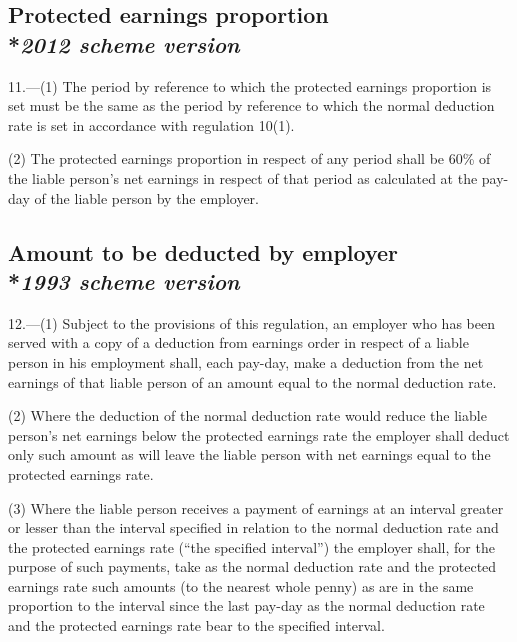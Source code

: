 \documentclass[12pt,a4paper]{article}
\begin{document}
\subsection[11. Protected earnings proportion --- \emph{2012 scheme version}]{Protected earnings proportion\\*\emph{2012 scheme version}}

11.---(1)  The period by reference to which the protected earnings proportion is set must be the same as the period by reference to which the normal deduction rate is set in accordance with regulation 10(1).

(2) The protected earnings proportion in respect of any period shall be 60\% of the liable person’s net earnings in respect of that period as calculated at the pay-day of the liable person by the employer.


\subsection[12. Amount to be deducted by employer --- \emph{1993 scheme version}]{Amount to be deducted by employer\\*\emph{1993 scheme version}}

12.—(1) Subject to the provisions of this regulation, an employer who has been served with a copy of a deduction from earnings order in respect of a liable person in his employment shall, each pay-day, make a deduction from the net earnings of that liable person of an amount equal to the normal deduction rate.

(2) Where the deduction of the normal deduction rate would reduce the liable person’s net earnings below the protected earnings rate the employer shall deduct only such amount as will leave the liable person with net earnings equal to the protected earnings rate.

(3) Where the liable person receives a payment of earnings at an interval greater or lesser than the interval specified in relation to the normal deduction rate and the protected earnings rate (“the specified interval”) the employer shall, for the purpose of such payments, take as the normal deduction rate and the protected earnings rate such amounts (to the nearest whole penny) as are in the same proportion to the interval since the last pay-day as the normal deduction rate and the protected earnings rate bear to the specified interval.
\end{document}
